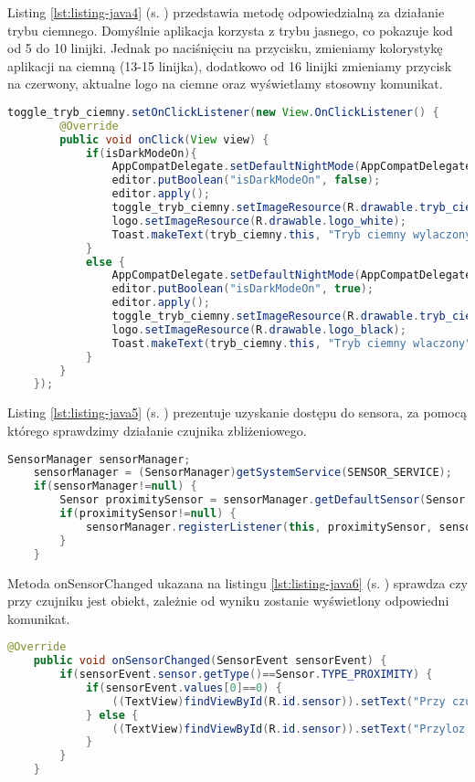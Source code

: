  Listing \ref{lst:listing-java4} (s. \pageref{lst:listing-java4}) przedstawia metodę odpowiedzialną za działanie trybu ciemnego. Domyślnie aplikacja korzysta z trybu jasnego, co pokazuje kod od 5 do 10 linijki. Jednak po naciśnięciu na przycisku, zmieniamy kolorystykę aplikacji na ciemną (13-15 linijka), dodatkowo od 16 linijki zmieniamy przycisk na czerwony, aktualne logo na ciemne oraz wyświetlamy stosowny komunikat.
\begin{lstlisting}[caption=Tryb Ciemny - Włączenie/wyłączenie trybu ciemnego, label={lst:listing-java4}, language=Java]
	toggle_tryb_ciemny.setOnClickListener(new View.OnClickListener() {
		@Override
		public void onClick(View view) {
			if(isDarkModeOn){
				AppCompatDelegate.setDefaultNightMode(AppCompatDelegate.MODE_NIGHT_NO);
				editor.putBoolean("isDarkModeOn", false);
				editor.apply();
				toggle_tryb_ciemny.setImageResource(R.drawable.tryb_ciemny_off);
				logo.setImageResource(R.drawable.logo_white);
				Toast.makeText(tryb_ciemny.this, "Tryb ciemny wylaczony", Toast.LENGTH_SHORT).show();
			}
			else {
				AppCompatDelegate.setDefaultNightMode(AppCompatDelegate.MODE_NIGHT_YES);
				editor.putBoolean("isDarkModeOn", true);
				editor.apply();
				toggle_tryb_ciemny.setImageResource(R.drawable.tryb_ciemny_on);
				logo.setImageResource(R.drawable.logo_black);
				Toast.makeText(tryb_ciemny.this, "Tryb ciemny wlaczony", Toast.LENGTH_SHORT).show();
			}
		}
	});
\end{lstlisting}

\newpage


Listing \ref{lst:listing-java5} (s. \pageref{lst:listing-java5}) prezentuje uzyskanie dostępu do sensora, za pomocą którego sprawdzimy działanie czujnika zbliżeniowego.
\begin{lstlisting}[caption=Czujnik Zbliżeniowy - Dostęp do czujnika, label={lst:listing-java5}, language=Java]
	SensorManager sensorManager;
	sensorManager = (SensorManager)getSystemService(SENSOR_SERVICE);
	if(sensorManager!=null) {
		Sensor proximitySensor = sensorManager.getDefaultSensor(Sensor.TYPE_PROXIMITY);
		if(proximitySensor!=null) {
			sensorManager.registerListener(this, proximitySensor, sensorManager.SENSOR_DELAY_NORMAL);
		}
	}
\end{lstlisting}


Metoda onSensorChanged ukazana na listingu \ref{lst:listing-java6} (s. \pageref{lst:listing-java6}) sprawdza czy przy czujniku jest obiekt, zależnie od wyniku zostanie wyświetlony odpowiedni komunikat.
\begin{lstlisting}[caption=Czujnik Zbliżeniowy - Działanie, label={lst:listing-java6}, language=Java]
	@Override
	public void onSensorChanged(SensorEvent sensorEvent) {
		if(sensorEvent.sensor.getType()==Sensor.TYPE_PROXIMITY) {
			if(sensorEvent.values[0]==0) {
				((TextView)findViewById(R.id.sensor)).setText("Przy czujniku jest obiekt");
			} else {
				((TextView)findViewById(R.id.sensor)).setText("Przyloz obiekt do czujnika");
			}
		}
	}
\end{lstlisting}


